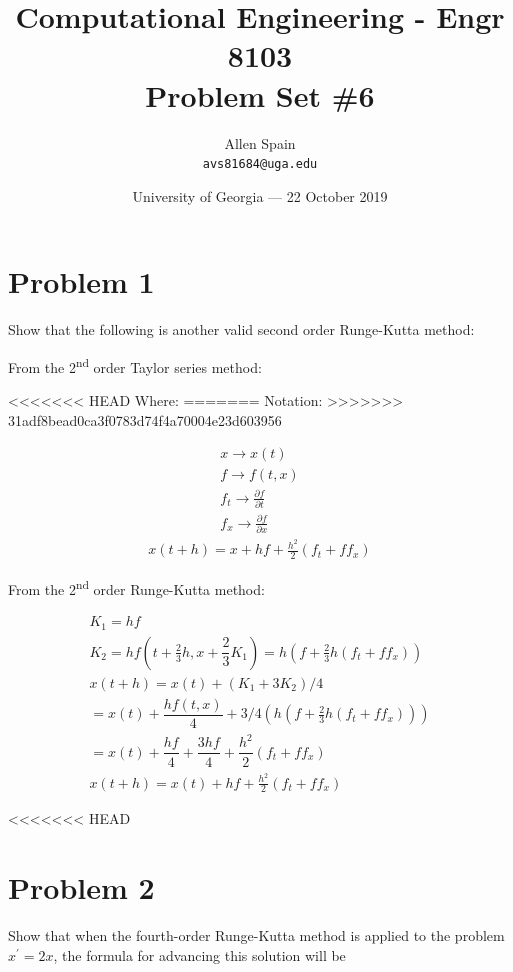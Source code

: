 \documentclass{article}
\title{Computational Engineering - Engr 8103 \\ Problem Set \#6} %
\author{Allen Spain\\ \texttt{avs81684@uga.edu}} %
\date{University of Georgia --- 22 October 2019 } %
\newcommand{\ts}{\textsuperscript}
\begin{document}
\maketitle %


\section*{Problem 1} %
Show that the following is another valid second order Runge-Kutta method:

\noindent
From the 2\ts{nd} order Taylor series method:

\noindent
<<<<<<< HEAD
Where:
=======
Notation:
>>>>>>> 31adf8bead0ca3f0783d74f4a70004e23d603956

\begin{align*}
	x  \rightarrow x(t) \\
	f  \rightarrow f(t,x) \\
	f_{t}  \rightarrow \frac{\partial f}{\partial t} \\
	f_{x}  \rightarrow \frac{\partial f}{\partial x}
\end{align*}
\begin{align*}
	\boxed{x(t + h) = x + hf + \frac{h^{2}}{2}(f_{t} + ff_{x})}
\end{align*}

\noindent
From the 2\ts{nd} order Runge-Kutta method:

\begin{align*}
	K_{1} = hf \\
	K_{2} = hf(t + \frac{2}{3}h, x + \dfrac{2}{3}K_{1}) = h(f +  \frac{2}{3}h(f_{t} + ff_{x})) \\
	x(t + h) = x(t) + (K_{1} + 3K_{2})/4 \\
	= x(t) + \dfrac{hf(t,x)}{4} + 3/4(h(f + \frac{2}{3}h(f_{t} + ff_{x}))) \\
	= x(t) + \dfrac{hf}{4} + \dfrac{3hf}{4} + \dfrac{h^{2}}{2}(f_{t} + ff_{x}) \\
	\boxed{x(t + h) = x(t) + hf + \frac{h^{2}}{2}(f_{t} + ff_{x})}
 \end{align*}

<<<<<<< HEAD
\section*{Problem 2}
Show that when the fourth-order Runge-Kutta method is applied to the problem $ x^{\prime} = 2x $, the formula for advancing this solution will be
\end{document}
